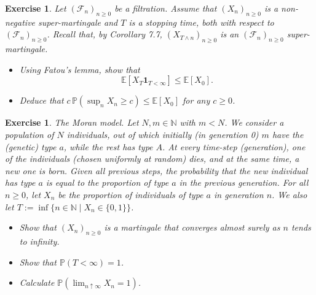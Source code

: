 \documentclass{article}
\newtheorem{exercise}[theorem]{Exercise}
\begin{document}
\begin{exercise}
Let $(\mathcal{F}_n)_{n \geq 0}$ be a filtration. Assume that $(X_n)_{n \geq 0}$ is a non-negative super-martingale and $T$ is a stopping time, both with respect to $(\mathcal{F}_n)_{n \geq 0}$. Recall that, by Corollary 7.7, $(X_{T \wedge n})_{n \geq 0}$ is an $(\mathcal{F}_n)_{n \geq 0}$ super-martingale.

\begin{itemize}
    \item[(a)] Using Fatou’s lemma, show that
    \[
    \mathbb{E}[X_T \mathbf{1}_{T < \infty}] \leq \mathbb{E}[X_0].
    \]

    \item[(b)] Deduce that $c \, \mathbb{P} \left( \sup_n X_n \geq c \right) \leq \mathbb{E}[X_0]$ for any $c \geq 0$.
\end{itemize}
\end{exercise}


\begin{exercise}
\textit{The Moran model.} Let $N, m \in \mathbb{N}$ with $m < N$. We consider a population of $N$ individuals, out of which initially (in generation 0) $m$ have the (genetic) type $a$, while the rest has type $A$. At every time-step (generation), one of the individuals (chosen uniformly at random) dies, and at the same time, a new one is born. Given all previous steps, the probability that the new individual has type $a$ is equal to the proportion of type $a$ in the previous generation. For all $n \geq 0$, let $X_n$ be the proportion of individuals of type $a$ in generation $n$. We also let $T := \inf\{n \in \mathbb{N} \mid X_n \in \{0,1\}\}$.

\begin{itemize}
    \item[(a)] Show that $(X_n)_{n \geq 0}$ is a martingale that converges almost surely as $n$ tends to infinity.
    \item[(b)] Show that $\mathbb{P}(T < \infty) = 1$.
    \item[(c)] Calculate $\mathbb{P}(\lim_{n \uparrow \infty} X_n = 1)$.
\end{itemize}
\end{exercise}
\end{document}
